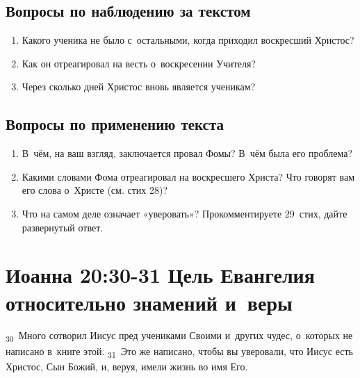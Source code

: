 \documentclass[a4paper,12pt]{article}
\begin{document}
\subsection*{Вопросы по наблюдению за текстом}
\begin{enumerate}
    \item Какого ученика не было с~остальными, когда приходил воскресший Христос? 
    
    \myline
    
    \myline
    \item Как он отреагировал на весть о~воскресении Учителя? 
    
    \myline
    
    \myline
    \item Через сколько дней Христос вновь является ученикам? 
    
    \myline
    
    \myline
\end{enumerate}

\subsection*{Вопросы по применению текста} 
\begin{enumerate}
    \item В~чём, на ваш взгляд, заключается провал Фомы? В~чём была его проблема?
    
    \myline
    
    \myline
    \item Какими словами Фома отреагировал на воскресшего Христа? Что говорят вам его слова о~Христе (см. стих 28)? 
    
    \myline
    
    \myline
    \item Что на самом деле означает «уверовать»? Прокомментируете 29~стих, дайте развернутый ответ.
    
    \myline
    
    \myline
\end{enumerate}



\section{Иоанна 20:30-31 Цель Евангелия относительно знамений и~веры}

\textsubscript{30}~Много сотворил Иисус пред учениками Своими и~других чудес, о~которых не написано в~книге этой.
\textsubscript{31}~Это же написано, чтобы вы уверовали, что Иисус есть Христос, Сын Божий, и, веруя, имели жизнь во имя Его. 
\end{document}
